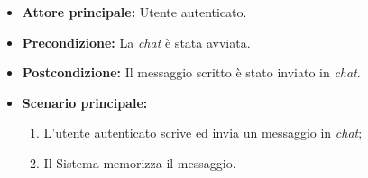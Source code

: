 \label{usecase:Invio messaggio chat}
\begin{itemize}
	\item \textbf{Attore principale:} Utente autenticato.

	\item \textbf{Precondizione:} La \textit{chat} è stata avviata.


	\item \textbf{Postcondizione:} Il messaggio scritto è stato inviato in \textit{chat}.

	\item \textbf{Scenario principale:}
	      \begin{enumerate}
		      \item L'utente autenticato scrive ed invia un messaggio in \textit{chat};
		      \item Il Sistema memorizza il messaggio.
	      \end{enumerate}
\end{itemize}
